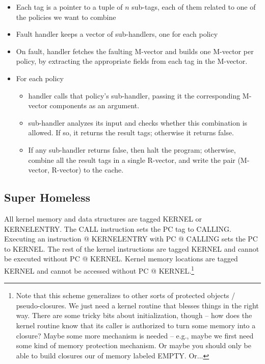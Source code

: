 \documentclass{article}
\newcommand{\bcp}[1]{{\color{blue}\em (BCP: #1)}}
\newcommand{\amd}[1]{{\color{purple}\em (AMD: #1)}}
\begin{document}
\begin{itemize}
\item Each tag is a pointer to a tuple of \(n\) sub-tags, each of them
  related to one of the policies we want to combine
\item Fault handler keeps a vector of sub-handlers, one for each policy
\item On fault, handler fetches the faulting M-vector and builds one
  M-vector per policy, by extracting the appropriate fields from each
  tag in the M-vector.
\item For each policy
  \begin{itemize}
  \item handler calls that policy's sub-handler, passing it the
    corresponding M-vector components as an argument.
  \item sub-handler analyzes its input and checks whether this
    combination is allowed. If so, it returns the result tags;
    otherwise it returns false.
  \item If any sub-handler returns false, then halt the program;
    otherwise, combine all the result tags in a single R-vector, and
    write the pair (M-vector, R-vector) to the cache.
  \end{itemize}
\end{itemize}

\subsection{Super Homeless}

All kernel memory and data structures are tagged KERNEL or KERNELENTRY.  The
CALL instruction sets the PC tag to CALLING.  Executing an instruction @
KERNELENTRY with PC @ CALLING sets the PC to KERNEL.  The rest of the kernel
instructions are tagged KERNEL and cannot be executed without PC @ KERNEL.
Kernel memory locations are tagged KERNEL and cannot be accessed without PC
@ KERNEL.\footnote{Note that this scheme generalizes to other sorts of
  protected objects / pseudo-closures.  We just need a kernel routine that
  blesses things in the right way.  There are some tricky bits about
  initialization, though -- how does the kernel routine know that
  {its caller}
  is authorized to turn some memory into a closure?  Maybe some more
  mechanism is needed -- e.g., maybe we first need some kind of memory
  protection mechanism.  Or maybe you should only be able to build closures
  our of memory labeled EMPTY.  Or...}
\end{document}
